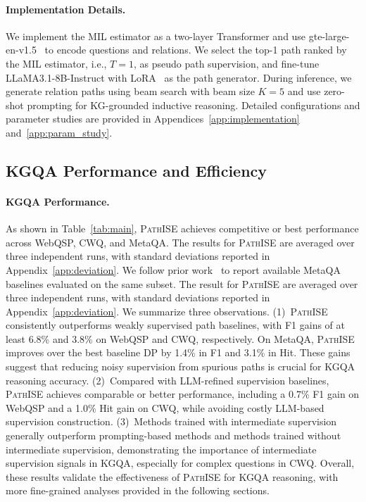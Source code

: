 \documentclass{article}
\newcommand{\framework}{\textsc{PathISE}\xspace}
\begin{document}
\paragraph{Implementation Details.} 

We implement the MIL estimator as a two-layer Transformer and use gte-large-en-v1.5~\citep{li_gte_2023} to encode questions and relations.
We select the top-1 path ranked by the MIL estimator, i.e., $T=1$, as pseudo path supervision, and fine-tune LLaMA3.1-8B-Instruct with LoRA~\citep{hu_lora_2021} as the path generator.
During inference, we generate relation paths using beam search with beam size $K=5$ and use zero-shot prompting for KG-grounded inductive reasoning.
Detailed configurations and parameter studies are provided in Appendices~\ref{app:implementation} and~\ref{app:param_study}.


\subsection{KGQA Performance and Efficiency}\label{sec:main_result}



\paragraph{KGQA Performance.} As shown in Table~\ref{tab:main}, \framework{} achieves competitive or best performance across WebQSP, CWQ, and MetaQA. The results for \framework{} are averaged over three independent runs, with standard deviations reported in Appendix~\ref{app:deviation}. We follow prior work~\citep{ma_dp_2025} to report available MetaQA baselines evaluated on the same subset. The result for \framework are averaged over three independent runs, with standard deviations reported in Appendix~\ref{app:deviation}. We summarize three observations. (1)~\framework{} consistently outperforms weakly supervised path baselines, with F1 gains of at least 6.8\% and 3.8\% on WebQSP and CWQ, respectively. On MetaQA, \framework{} improves over the best baseline DP by 1.4\% in F1 and 3.1\% in Hit. These gains suggest that reducing noisy supervision from spurious paths is crucial for KGQA reasoning accuracy. (2)~Compared with LLM-refined supervision baselines, \framework{} achieves comparable or better performance, including a 0.7\% F1 gain on WebQSP and a 1.0\% Hit gain on CWQ, while avoiding costly LLM-based supervision construction. (3)~Methods trained with intermediate supervision generally outperform prompting-based methods and methods trained without intermediate supervision, demonstrating the importance of intermediate supervision signals in KGQA, especially for complex questions in CWQ. Overall, these results validate the effectiveness of \framework{} for KGQA reasoning, with more fine-grained analyses provided in the following sections.
\end{document}
